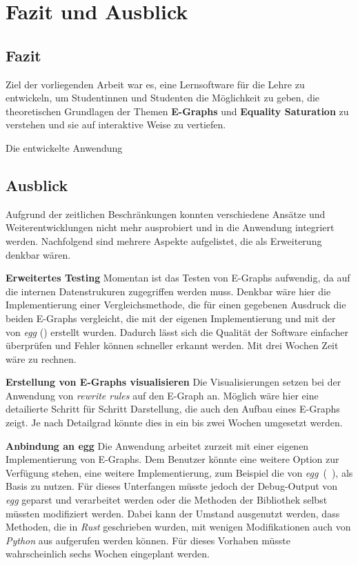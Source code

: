 \section{Fazit und Ausblick}\label{sec:fazit}

\subsection{Fazit}

Ziel der vorliegenden Arbeit war es, eine Lernsoftware für die Lehre zu entwickeln, um Studentinnen und Studenten die Möglichkeit zu geben, 
die theoretischen Grundlagen der Themen \textbf{E-Graphs} und \textbf{Equality Saturation} zu verstehen und sie auf interaktive Weise zu vertiefen.

Die entwickelte Anwendung 








\subsection{Ausblick}

Aufgrund der zeitlichen Beschränkungen konnten verschiedene Ansätze und Weiterentwicklungen nicht mehr ausprobiert und in die Anwendung integriert werden.
Nachfolgend sind mehrere Aspekte aufgelistet, die als Erweiterung denkbar wären. 

\textbf{Erweitertes Testing} Momentan ist das Testen von E-Graphs aufwendig, da auf die internen Datenstrukuren zugegriffen werden muss.
Denkbar wäre hier die Implementierung einer Vergleichsmethode, die für einen gegebenen Ausdruck die beiden E-Graphs vergleicht,
die mit der eigenen Implementierung und mit der von \textit{egg} (\cite{2021-egg}) erstellt wurden. 
Dadurch lässt sich die Qualität der Software einfacher überprüfen und Fehler können schneller erkannt werden.
Mit drei Wochen Zeit wäre zu rechnen.

\textbf{Erstellung von E-Graphs visualisieren} Die Visualisierungen setzen bei der Anwendung von \textit{rewrite rules} auf den E-Graph an.
Möglich wäre hier eine detailierte Schritt für Schritt Darstellung, die auch den Aufbau eines E-Graphs zeigt. Je nach Detailgrad könnte dies in ein bis zwei Wochen umgesetzt werden.

\textbf{Anbindung an egg} Die Anwendung arbeitet zurzeit mit einer eigenen Implementierung von E-Graphs. Dem Benutzer könnte eine weitere Option zur Verfügung stehen, eine weitere
Implementierung, zum Beispiel die von \textit{egg}~(~\cite{2021-egg}), als Basis zu nutzen.
Für dieses Unterfangen müsste jedoch der Debug-Output von \textit{egg} geparst und verarbeitet werden oder die Methoden der Bibliothek selbst müssten modifiziert werden.
Dabei kann der Umstand ausgenutzt werden, dass Methoden, die in \textit{Rust} geschrieben wurden, mit wenigen Modifikationen auch von \textit{Python} aus aufgerufen werden können.
Für dieses Vorhaben müsste wahrscheinlich sechs Wochen eingeplant werden.

